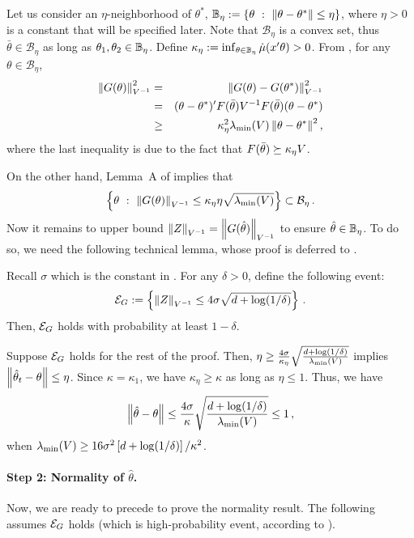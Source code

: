 Let us consider an $\eta$-neighborhood of $\theta^*$, $\mathbb{B}_\eta := \{\theta ~:~ \left\|\theta-\theta^*\right\| \le \eta\}$, where $\eta>0$ is a constant that will be specified later. Note that $\mathcal{B}_{\eta}$ is a convex set, thus $\bar{\theta} \in \mathcal{B}_{\eta}$ as long as $\theta_1,\theta_2\in\mathbb{B}_\eta$. Define $\kappa_{\eta} := \inf_{\theta \in \mathbb{B}_\eta} \dot{\mu}(x'\theta)>0$. From ,  for any $\theta \in \mathcal{B}_\eta$,
\begin{eqnarray*}
\left\|G(\theta)\right\|_{V^{-1}}^2 &=& \left\|G(\theta)-G(\theta^*)\right\|_{V^{-1}}^2 \\
&=& (\theta-\theta^*)' F(\bar{\theta}) V^{-1} F(\bar{\theta}) (\theta-\theta^*) \\
&\ge& \kappa_{\eta}^2 \lambda_{\min}(V) \left\|\theta - \theta^*\right\|^2,
\end{eqnarray*}
where the last inequality is due to the fact that $F(\bar{\theta}) \succeq \kappa_\eta V$.

On the other hand, Lemma~A of \citet{chen1999strong} implies that
\[
\left \{\theta ~:~\left\|G(\theta)\right\|_{V^{-1}} \le  \kappa_{\eta} \eta \sqrt{\lambda_{\min}(V)} \right \}  \subset \mathcal{B}_{\eta}\,.
\]
Now it remains to upper bound $\left\|Z\right\|_{V^{-1}}=\left\|G(\hat{\theta})\right\|_{V^{-1}}$ to ensure $\hat{\theta}\in\mathbb{B}_\eta$.  
To do so, we need the following technical lemma, whose proof is deferred to . 
\begin{lemma} \label{lm:hoeffding}
Recall $\sigma$ which is the constant in .  For any $\delta>0$, define the following event:
\begin{equation*}
\mathcal{E}_G := \left\{\left\|Z\right\|_{V^{-1}} \le  4\sigma \sqrt{d+\log(1/\delta)}\right\}\,.
\end{equation*}
Then, $\mathcal{E}_G$ holds with probability at least $1-\delta$.
\end{lemma}

Suppose $\mathcal{E}_G$ holds for the rest of the proof.  Then, $\eta \ge \frac{4\sigma}{\kappa_{\eta}} \sqrt{\frac{d + \log(1/\delta)}{\lambda_{\min}(V)}}$ implies $\left\|\hat{\theta}_t-\theta\right\| \le \eta$. Since $\kappa=\kappa_1$, we have $\kappa_\eta \ge \kappa$ as long as $\eta \le 1$. Thus, we have
\begin{equation} \label{eq:intial} 
\left\|\hat{\theta}-\theta\right\| \le \frac{4\sigma}{\kappa} \sqrt{\frac{d  + \log(1/\delta)}{\lambda_{\min}(V)}} \le 1\,,
\end{equation}
when $\lambda_{\min} (V) \ge 16\sigma^2\left[d + \log(1/\delta)\right]/\kappa^2$. 

\paragraph{Step 2: Normality of $\hat{\theta}$.} Now, we are ready to precede to prove the normality result. 
The following assumes $\mathcal{E}_G$ holds (which is high-probability event, according to ).

